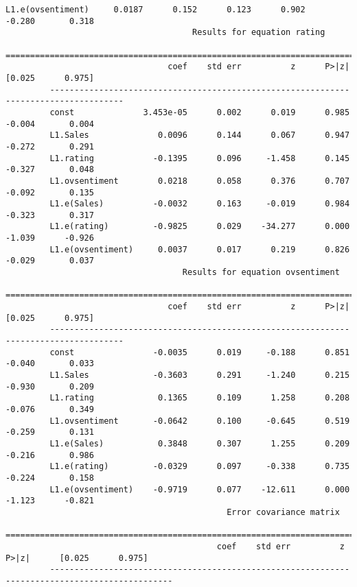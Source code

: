 \documentclass[11pt]{article}
\begin{document}
\begin{Verbatim}[commandchars=\\\{\}]
         L1.e(ovsentiment)     0.0187      0.152      0.123      0.902      -0.280       0.318
                                      Results for equation rating                             
         =====================================================================================
                                 coef    std err          z      P>|z|      [0.025      0.975]
         -------------------------------------------------------------------------------------
         const              3.453e-05      0.002      0.019      0.985      -0.004       0.004
         L1.Sales              0.0096      0.144      0.067      0.947      -0.272       0.291
         L1.rating            -0.1395      0.096     -1.458      0.145      -0.327       0.048
         L1.ovsentiment        0.0218      0.058      0.376      0.707      -0.092       0.135
         L1.e(Sales)          -0.0032      0.163     -0.019      0.984      -0.323       0.317
         L1.e(rating)         -0.9825      0.029    -34.277      0.000      -1.039      -0.926
         L1.e(ovsentiment)     0.0037      0.017      0.219      0.826      -0.029       0.037
                                    Results for equation ovsentiment                          
         =====================================================================================
                                 coef    std err          z      P>|z|      [0.025      0.975]
         -------------------------------------------------------------------------------------
         const                -0.0035      0.019     -0.188      0.851      -0.040       0.033
         L1.Sales             -0.3603      0.291     -1.240      0.215      -0.930       0.209
         L1.rating             0.1365      0.109      1.258      0.208      -0.076       0.349
         L1.ovsentiment       -0.0642      0.100     -0.645      0.519      -0.259       0.131
         L1.e(Sales)           0.3848      0.307      1.255      0.209      -0.216       0.986
         L1.e(rating)         -0.0329      0.097     -0.338      0.735      -0.224       0.158
         L1.e(ovsentiment)    -0.9719      0.077    -12.611      0.000      -1.123      -0.821
                                             Error covariance matrix                                    
         ===============================================================================================
                                           coef    std err          z      P>|z|      [0.025      0.975]
         -----------------------------------------------------------------------------------------------

\end{Verbatim}
\end{document}
